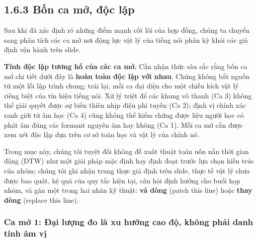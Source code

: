 \documentclass[11pt,a4paper]{article}
\begin{document}
\subsection*{1.6.3 Bốn ca mở, độc lập}

Sau khi đã xác định rõ những điểm mạnh cốt lõi của hợp đồng, chúng ta chuyển sang phân tích các ca mở nơi động lực vật lý của tiếng nói phân kỳ khỏi các giả định vận hành trên slide.

\textbf{Tính độc lập tương hỗ của các ca mở.} Cần nhận thức sâu sắc rằng bốn ca mở chi tiết dưới đây là \textbf{hoàn toàn độc lập với nhau}. Chúng không bắt nguồn từ một lỗi lập trình chung; trái lại, mỗi ca đại diện cho một chiều kích vật lý riêng biệt của tín hiệu tiếng nói. Xử lý triệt để các khung vô thanh (Ca 3) không thể giải quyết được sự biến thiên nhịp điệu phi tuyến (Ca 2); định vị chính xác ranh giới từ âm học (Ca 4) cũng không thể kiểm chứng được liệu người học có phát âm đúng các formant nguyên âm hay không (Ca 1). Mỗi ca mở cần được xem xét độc lập dựa trên cơ sở toán học và vật lý của chính nó.

Trong mục này, chúng tôi tuyệt đối không đề xuất thuật toán uốn nắn thời gian động (DTW) như một giải pháp mặc định hay định đoạt trước lựa chọn kiến trúc của nhóm; chúng tôi ghi nhận trung thực giả định trên slide, thực tế vật lý chưa được bao quát, hệ quả của quy tắc hiện tại, câu hỏi định hướng cho buổi họp nhóm, và gán một trong hai nhãn kỹ thuật: \textbf{vá dòng} (patch this line) hoặc \textbf{thay dòng} (replace this line).

\subsubsection*{Ca mở 1: Đại lượng đo là xu hướng cao độ, không phải danh tính âm vị}
\end{document}
